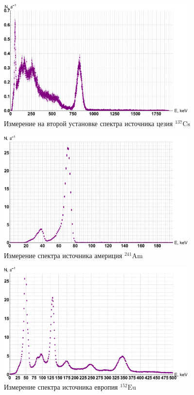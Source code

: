 \documentclass[12pt,a4paper]{article}
\begin{document}
\begin{figure}[H]
	\label{graf_cs2}
	\includegraphics[width=10cm]{src/cs2.pdf}
	\caption{Измерение на второй установке спектра источника цезия $ \mathrm{^{137}Cs} $} 
\end{figure} 
    
\begin{figure}[H]
	\label{graf_am}
	\includegraphics[width=10cm]{src/am.pdf}
	\caption{Измерение спектра источника америция $ \mathrm{^{241}Am} $}
\end{figure} 
    
\begin{figure}[H]
	\label{graf_eu}
	\includegraphics[width=10cm]{src/eu.pdf}
	\caption{Измерение спектра источника европия $ \mathrm{^{152}Eu} $}
\end{figure}
\end{document}
